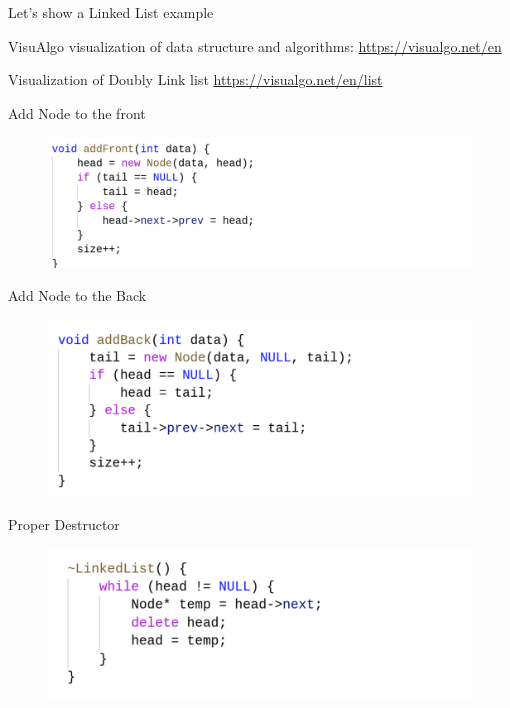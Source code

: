 \documentclass{beamer}
\begin{document}
\begin{frame}{Let's show a Linked List example}
    \begin{block}{VisuAlgo}
         visualization of data structure and algorithms: \url{https://visualgo.net/en}
    \end{block}
    \begin{block}{Visualization of Doubly Link list}
        \url{https://visualgo.net/en/list}
    \end{block}
\end{frame}

\begin{frame}{Add Node to the front}
        \begin{figure}
            \includegraphics[width=1.5\textwidth]{LL_addfront.png}
    \end{figure}
\end{frame}

\begin{frame}{Add Node to the Back}
        \begin{figure}
            \includegraphics[width=1.3\textwidth]{LL_addback.png}
    \end{figure}
\end{frame}

\begin{frame}{Proper Destructor}
        \begin{figure}
            \includegraphics[width=1.3\textwidth]{LL_destructor.png}
    \end{figure}
\end{frame}
\end{document}

